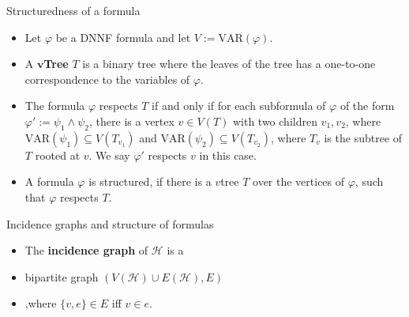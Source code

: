 \begin{frame}[t]{Structuredness of a formula}
	\begin{itemize}[<+->]
		\item Let $\varphi$ be a DNNF formula and let $V := \mathrm{VAR}(\varphi)$.
		\item A \textbf{$\mathbf{v}$Tree} $T$ is a binary tree where the leaves of the tree has a one-to-one correspondence to the variables of $\varphi$.
		\item The formula $\varphi$ respects $T$ if and only if for each subformula of  $\varphi$ of the form $\varphi' := \psi_1 \land \psi_2$, there is a vertex $v \in V(T)$ with two children $v_1, v_2$, where $\mathrm{VAR}(\psi_1)\subseteq V(T_{v_1})$ and $\mathrm{VAR}(\psi_2) \subseteq V(T_{v_2})$, where $T_v$ is the subtree of $T$ rooted at $v$. We say $\varphi'$ respects $v$ in this case.
		\item A formula $\varphi$ is structured, if there is a $v$tree $T$ over the vertices of $\varphi$, such that $\varphi$ respects $T$.
	\end{itemize}

\end{frame}

\begin{frame}[t]{Incidence graphs and structure of formulas}
	\begin{itemize}
		\item The \textbf{incidence graph} of $\mathcal{H}$ is a 
		\item[] \hspace{1cm}bipartite graph $(V(\mathcal{H}) \cup E(\mathcal{H}), E)$
		\item[] \hspace{1cm},where $\{v, e\} \in E$ iff $v \in e$.
			\vspace{.5cm}


			\vspace{.5cm}
	\end{itemize}

\end{frame}

